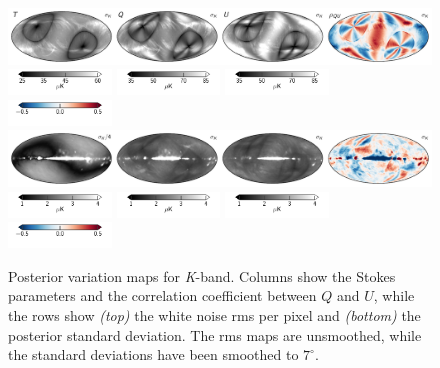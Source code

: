 \documentclass[twocolumn]{../../common/aa}
\newcommand{\K}[0]{\textit K}
\begin{document}
\begin{figure}[t]
	\centering
	\includegraphics[width=\textwidth]{figures/023-WMAP_K_rms.pdf}\\
	\includegraphics[width=0.245\textwidth]{figures/cbar_rms_I.pdf}
	\includegraphics[width=0.245\textwidth]{figures/cbar_rms_P.pdf}
	\includegraphics[width=0.245\textwidth]{figures/cbar_rms_P.pdf}
	\includegraphics[width=0.245\textwidth]{figures/cbar_rho.pdf}\\
	\includegraphics[width=\textwidth]{figures/023-WMAP_K_std.pdf}\\
	\includegraphics[width=0.245\textwidth]{figures/cbar_std.pdf}
	\includegraphics[width=0.245\textwidth]{figures/cbar_std.pdf}
	\includegraphics[width=0.245\textwidth]{figures/cbar_std.pdf}
	\includegraphics[width=0.245\textwidth]{figures/cbar_rho.pdf}\\
	\caption{Posterior variation maps for \K-band. Columns show the Stokes parameters and the correlation coefficient between $Q$ and $U$, while the rows show \textit{(top)} the white noise rms per pixel and \textit{(bottom)} the posterior standard deviation. The rms maps are unsmoothed, while the standard deviations have been smoothed to $7^\circ$.}
        \label{fig:K_rms_std}
\end{figure}
\end{document}
